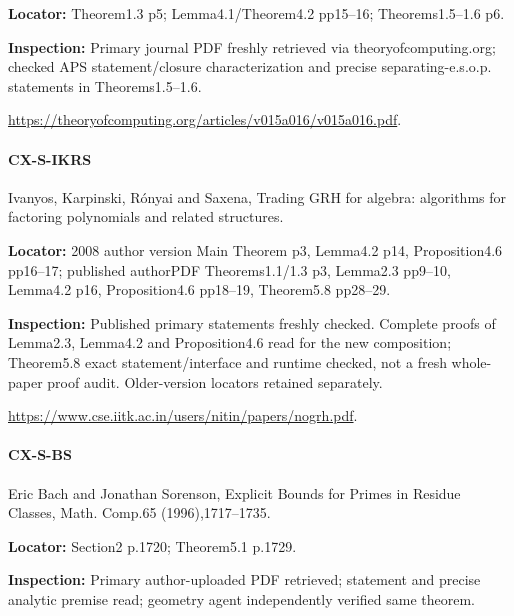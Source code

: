 \documentclass[11pt,a4paper]{article}
\begin{document}
\textbf{Locator:} Theorem1.\allowbreak{}3 p5; Lemma4.\allowbreak{}1/\allowbreak{}Theorem4.\allowbreak{}2 pp15–\allowbreak{}16; Theorems1.\allowbreak{}5–\allowbreak{}1.\allowbreak{}6 p6.

\textbf{Inspection:} Primary journal PDF freshly retrieved via theoryofcomputing.\allowbreak{}org; checked APS statement/\allowbreak{}closure characterization and precise separating-e.\allowbreak{}s.\allowbreak{}o.\allowbreak{}p.\allowbreak{} statements in Theorems1.\allowbreak{}5–\allowbreak{}1.\allowbreak{}6.\allowbreak{}

\url{https://theoryofcomputing.org/articles/v015a016/v015a016.pdf}.

\paragraph{CX-S-IKRS} Ivanyos, Karpinski, Rónyai and Saxena, Trading GRH for algebra:\allowbreak{} algorithms for factoring polynomials and related structures.

\textbf{Locator:} 2008 author version Main Theorem p3, Lemma4.\allowbreak{}2 p14, Proposition4.\allowbreak{}6 pp16–\allowbreak{}17; published authorPDF Theorems1.\allowbreak{}1/\allowbreak{}1.\allowbreak{}3 p3, Lemma2.\allowbreak{}3 pp9–\allowbreak{}10, Lemma4.\allowbreak{}2 p16, Proposition4.\allowbreak{}6 pp18–\allowbreak{}19, Theorem5.\allowbreak{}8 pp28–\allowbreak{}29.

\textbf{Inspection:} Published primary statements freshly checked.\allowbreak{} Complete proofs of Lemma2.\allowbreak{}3, Lemma4.\allowbreak{}2 and Proposition4.\allowbreak{}6 read for the new composition; Theorem5.\allowbreak{}8 exact statement/\allowbreak{}interface and runtime checked, not a fresh whole-paper proof audit.\allowbreak{} Older-version locators retained separately.\allowbreak{}

\url{https://www.cse.iitk.ac.in/users/nitin/papers/nogrh.pdf}.

\paragraph{CX-S-BS} Eric Bach and Jonathan Sorenson, Explicit Bounds for Primes in Residue Classes, Math.\allowbreak{} Comp.\allowbreak{}65 (1996),1717–\allowbreak{}1735.

\textbf{Locator:} Section2 p.\allowbreak{}1720; Theorem5.\allowbreak{}1 p.\allowbreak{}1729.

\textbf{Inspection:} Primary author-uploaded PDF retrieved; statement and precise analytic premise read; geometry agent independently verified same theorem.\allowbreak{}
\end{document}
